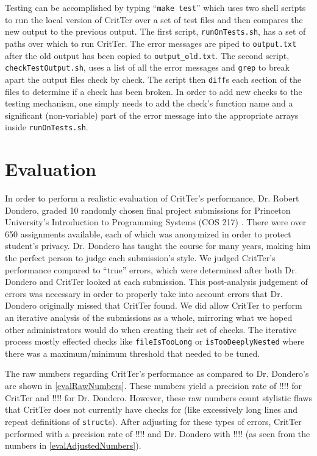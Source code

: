 \documentclass[12pt]{report}
\newcommand{\programName}{CritTer\xspace}
\begin{document}
Testing can be accomplished by typing ``\lstinline{make test}'' which uses two shell scripts to run the 
local version of \programName over a set of test files and then compares the new output to the previous 
output. The first script, \lstinline{runOnTests.sh}, has a set of paths over which to run \programName. The 
error messages are piped to \lstinline{output.txt} after the old output has been copied to 
\lstinline{output_old.txt}. The second script, \lstinline{checkTestOutput.sh}, uses a list of all the error 
messages and \lstinline{grep} to break apart the output files check by check. The script then 
\lstinline{diff}s each section of the files to determine if a check has been broken. In order to add new 
checks to the testing mechanism, one simply needs to add the check's function name and a significant 
(non-variable) part of the error message into the appropriate arrays inside \lstinline{runOnTests.sh}.

\chapter{Evaluation}

In order to perform a realistic evaluation of \programName's performance, Dr. Robert Dondero, graded 
10 randomly chosen final project submissions for Princeton University's Introduction to Programming 
Systems (COS 217) \cite{cos217}. There were over 650 assignments available, each of which was 
anonymized in order to protect student's privacy. Dr. Dondero has taught the course for many years, 
making him the perfect person to judge each submission's style. We judged \programName's 
performance compared to ``true'' errors, which were determined after both Dr. Dondero and 
\programName looked at each submission. This post-analysis judgement of errors was necessary in 
order to properly take into account errors that Dr. Dondero originally missed that \programName found. 
We did allow \programName to perform an iterative analysis of the submissions as a whole, mirroring 
what we hoped other administrators would do when creating their set of checks. The iterative process 
mostly effected checks like \lstinline{fileIsTooLong} or \lstinline{isTooDeeplyNested} where there was a 
maximum/minimum threshold that needed to be tuned. 

The raw numbers regarding \programName's performance as compared to Dr. Dondero's are shown in 
\autoref{evalRawNumbers}. These numbers yield a precision rate of !!!! for \programName and !!!! for Dr. 
Dondero. However, these raw numbers count stylistic flaws that \programName does not currently have 
checks for (like excessively long lines and repeat definitions of \lstinline{struct}s). After adjusting for these 
types of errors, \programName performed with a precision rate of !!!! and Dr. Dondero with !!!! (as seen 
from the numbers in \autoref{evalAdjustedNumbers}).
\end{document}

